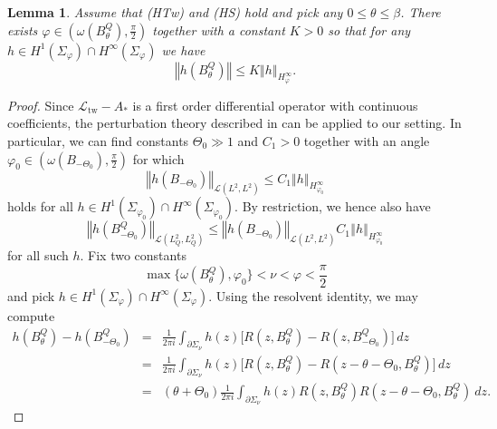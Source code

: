\documentclass[10pt]{articleHJ}
\newcommand{\norm}[1]{\left\Vert#1\right\Vert}		%
\newtheorem{lem}[thm]{Lemma}
\numberwithin{equation}{section}
\begin{document}
\begin{lem}
\label{lem:nls:h:inf:calc}
Assume that (HTw) and (HS) hold
and pick any $0 \le \theta \le \beta$.
There exists $\varphi \in (\omega(B^Q_{\theta}) , \frac{\pi}{2})$
together with a constant $K > 0$ so that for any
$h \in H^1(\Sigma_{\varphi}) \cap H^\infty(\Sigma_{\varphi})$
we have
\begin{equation}
\norm{ h(B^Q_{\theta}) } \le K \norm{h}_{H^\infty_{\varphi}} .
\end{equation}
\end{lem}
\begin{proof}
Since $\mathcal{L}_{\mathrm{tw}} - A_*$ is a first order
differential operator with continuous coefficients,
the perturbation theory described in \cite[{\S}8]{weis2006h}
can be applied to our setting.
In particular,
we can find constants $\Theta_0 \gg 1$
and $C_1 > 0$ together with an angle $\varphi_0 \in (\omega(B_{-\Theta_0}), \frac{\pi}{2} )$
for which
\begin{equation}
\norm{ h(B_{-\Theta_0}) }_{\mathcal{L}(L^2,L^2)} \le C_1 \norm{h}_{H^\infty_{\varphi_0}}
\end{equation}
holds for all $h \in H^1(\Sigma_{\varphi_0}) \cap H^\infty(\Sigma_{\varphi_0})$.
By restriction, we hence also have
\begin{equation}
\norm{ h(B^Q_{-\Theta_0}) }_{\mathcal{L}(L^2_Q,L^2_Q)} \le
\norm{ h(B_{-\Theta_0}) }_{\mathcal{L}(L^2,L^2)}
 C_1 \norm{h}_{H^\infty_{\varphi_0}}
\end{equation}
for all such $h$.
Fix two constants
\begin{equation}
\max\{ \omega(B^Q_{\theta} )  ,  \varphi_0 \} < \nu < \varphi < \frac{\pi}{2}
\end{equation}
and pick $h \in  H^1(\Sigma_{\varphi}) \cap H^\infty(\Sigma_{\varphi})$.
Using the resolvent identity,
we may compute
\begin{equation}
\begin{array}{lcl}
h(B^Q_{\theta} ) - h(B^Q_{-\Theta_0})
& = & \frac{1}{2\pi i}
 \int_{\partial\Sigma_\nu} h(z)
 \big[ R(z , B^Q_{\theta}) - R(z, B^Q_{-\Theta_0}) \big] \, dz
\\[0.2cm]
& = &
\frac{1}{2\pi i}
 \int_{\partial\Sigma_\nu} h(z)
 \big[ R(z , B^Q_{\theta}) - R(z - \theta - \Theta_0, B^Q_{\theta}) \big]
     \, dz
\\[0.2cm]
& = &
(\theta + \Theta_0)
\frac{1}{2\pi i} \int_{\partial\Sigma_\nu} h(z)
  R(z , B^Q_{\theta}) R(z - \theta - \Theta_0, B^Q_{\theta}) \ dz.
\end{array}
\end{equation}

\end{proof}
\end{document}
